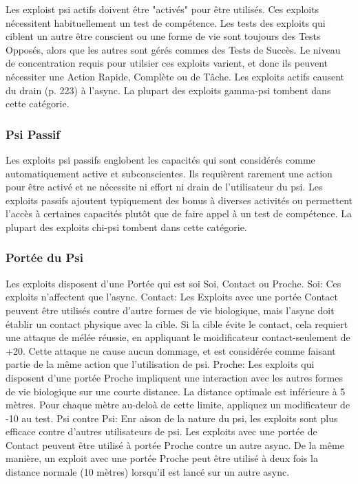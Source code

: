 Les exploist psi actifs doivent être "activés" pour être utilisés. Ces exploits nécessitent habituellement un test de compétence. Les tests des exploits qui ciblent un autre être conscient ou une forme de vie sont toujours des Tests Opposés, alors que les autres sont gérés commes des Tests de Succès. Le niveau de concentration requis pour utilsier ces exploits varient, et donc ils peuvent nécessiter une Action Rapide, Complète ou de Tâche. Les exploits actifs causent du drain (p. 223) à l'async. La plupart des exploits gamma-psi tombent dans cette catégorie. 

\subsubsection{Psi Passif} 

Les exploits psi passifs englobent les capacités qui sont considérés comme automatiquement active et subconscientes. Ils requièrent rarement une action pour être activé et ne nécessite ni effort ni drain de l'utilisateur du psi. Les exploits passifs ajoutent typiquement des bonus à diverses activités ou permettent l'accès à certaines capacités plutôt que de faire appel à un test de compétence. La plupart des exploits chi-psi tombent dans cette catégorie. 

\subsubsection{Portée du Psi} 

Les exploits disposent d'une Portée qui est soi Soi, Contact ou Proche. Soi: Ces exploits n'affectent que l'async. Contact: Les Exploits avec une portée Contact peuvent être utilisés contre d'autre formes de vie biologique, mais l'async doit établir un contact physique avec la cible. Si la cible évite le contact, cela requiert une attaque de mélée réussie, en appliquant le moidificateur contact-seulement de +20. Cette attaque ne cause aucun dommage, et est considérée comme faisant partie de la même action que l'utilisation de psi. Proche: Les exploits qui disposent d'une portée Proche impliquent une interaction avec les autres formes de vie biologique sur une courte distance. La distance optimale est inférieure à 5 mètres. Pour chaque mètre au-deloà de cette limite, appliquez un modificateur de -10 au test. Psi contre Psi: Enr aison de la nature du psi, les exploits sont plus efficace contre d'autres utilisateurs de psi. Les exploits avec une portée de Contact peuvent être utilisé à portée Proche contre un autre async. De la même manière, un exploit avec une portée Proche peut être utilisé à deux fois la distance normale (10 mètres) lorsqu'il est lancé sur un autre async. 

